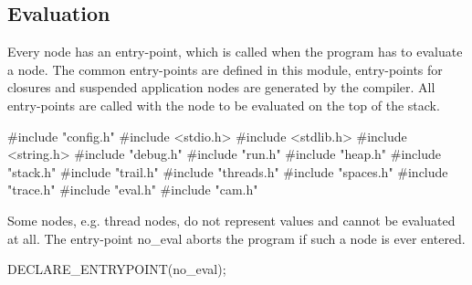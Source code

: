 %
%
\subsection{Evaluation}\label{sec:eval}
Every node has an entry-point, which is called when the program has to
evaluate a node. The common entry-points are defined in this module,
entry-points for closures and suspended application nodes are
generated by the compiler. All entry-points are called with the node
to be evaluated on the top of the stack.

\nwenddocs{}\endmoddef\nwstartdeflinemarkup{}\nwenddeflinemarkup
#include "config.h"
#include <stdio.h>
#include <stdlib.h>
#include <string.h>
#include "debug.h"
#include "run.h"
#include "heap.h"
#include "stack.h"
#include "trail.h"
#include "threads.h"
#include "spaces.h"
#include "trace.h"
#include "eval.h"
#include "cam.h"

\nwendcode{}\nwdocspar
Some nodes, e.g. thread nodes, do not represent values and cannot be
evaluated at all. The entry-point {\Tt{}no{\_}eval\nwendquote} aborts the program if
such a node is ever entered.

\nwenddocs{}\endmoddef\nwstartdeflinemarkup{}\nwenddeflinemarkup
DECLARE_ENTRYPOINT(no_eval);

